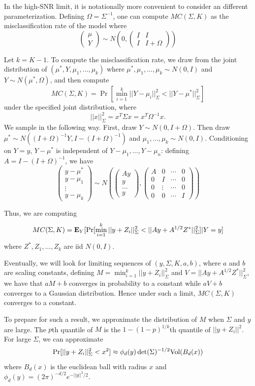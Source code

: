\documentclass[12pt]{article}
\begin{document}
In the high-SNR limit, it is notationally more convenient to consider an different parameterization.
Defining $\Omega=\Sigma^{-1}$, one can compute $MC(\Sigma, K)$ as the misclassification rate
of the model where
\[
\begin{pmatrix}
\mu \\
Y
\end{pmatrix}\sim N\left(0, \begin{pmatrix}
I & I\\
I & I + \Omega
\end{pmatrix}\right)
\]

Let $k = K-1$.  To compute the misclassification rate, we draw from
the joint distribution of $(\mu^*, Y, \mu_1,\hdots, \mu_k)$ where
$\mu^*,\mu_1,\hdots, \mu_k \sim N(0, I)$ and $Y \sim N(\mu^*, \Omega)$,
and then compute
\[
MC(\Sigma, K) = \Pr[\min_{i=1}^k ||Y - \mu_i||^2_\Sigma < ||Y - \mu^*||^2_\Sigma]
\]
under the specified joint distribution, where
\[
||x||_\Sigma^2 = x^T \Sigma x = x^T\Omega^{-1}x.
\]
We sample in the following way.  First, draw $Y \sim N(0, I
+ \Omega)$.  Then draw $\mu^* \sim N((I+\Omega)^{-1}Y,
I-(I+\Omega)^{-1})$ and $\mu_1,\hdots, \mu_k \sim N(0, I)$.
Conditioning on $Y = y$, $Y - \mu^*$ is independent of $Y - \mu_1,\hdots, Y - \mu_n$:
defining $A = I-(I + \Omega)^{-1}$, we have
\[
\begin{pmatrix}
y - \mu^*\\
y - \mu_1\\
\vdots\\
y - \mu_k
\end{pmatrix} \sim N\left(
\begin{pmatrix}
Ay\\
y\\
\hdots\\
y
\end{pmatrix},
\begin{pmatrix}
A & 0 & \cdots &0\\
0 & I & \cdots &0\\
0 & \vdots & \cdots & 0\\
0 & 0 & \cdots &I
\end{pmatrix}
\right)
\]

Thus, we are computing
\[
MC(\Sigma, K) = \textbf{E}_Y[\Pr[\min_{i=1}^k ||y + Z_i||^2_\Sigma < ||Ay + A^{1/2} Z^*||^2_\Sigma]|Y=y]
\]
where $Z^*,Z_1,\hdots, Z_k$ are iid $N(0, I)$.

Eventually, we will look for limiting sequences of $(y, \Sigma, K, a,
b)$, where $a$ and $b$ are scaling constants, defining $M
= \min_{i=1}^k ||y + Z_i||^2_\Sigma$ and $V = ||Ay + A^{1/2}
Z^*||^2_\Sigma$, we have that $aM + b$ converges in probability to a
constant while $aV + b$ converges to a Gaussian distribution.
Hence under such a limit, $MC(\Sigma, K)$ converges to a constant.

To prepare for such a result, we approximate the distribution of $M$ when $\Sigma$ and $y$ are large.
The $p$th quantile of $M$ is the $1-(1-p)^{1/k}$th quantile of $||y + Z_i||^2$.
For large $\Sigma$, we can approximate
\[
\Pr[||y+ Z_i||^2_\Sigma < x^2] \approx \phi_d(y) \det(\Sigma)^{-1/2}\text{Vol}(B_d(x))
\]
where $B_d(x)$ is the euclidean ball with radius $x$ and $\phi_d(y) = (2\pi)^{-d/2} e^{-||y||^2/2}$.
\end{document}

